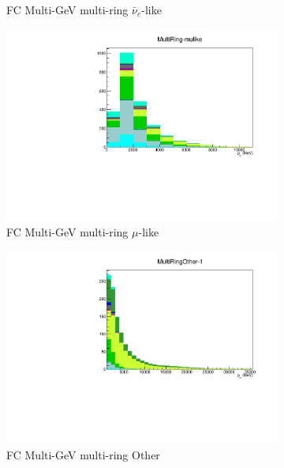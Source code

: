 \begin{figure}[ht]
\begin{subfigure}[t]{0.49\textwidth}
    \caption{FC Multi-GeV multi-ring $\bar{\nu}_e$-like}
    \end{subfigure}
    \begin{subfigure}[t]{0.49\textwidth}
    \includegraphics[width=\textwidth, trim= 0 0 0 30, clip]{Figures/Selections/AtmosphericByMode/MultiRing-mulike_LepMom.pdf}
    \caption{FC Multi-GeV multi-ring $\mu$-like}
    \end{subfigure}
    \begin{subfigure}[t]{0.49\textwidth}
    \includegraphics[width=\textwidth, trim= 0 0 0 30, clip]{Figures/Selections/AtmosphericByMode/MultiRingOther-1_LepMom.pdf}
    \caption{FC Multi-GeV multi-ring Other}
    \end{subfigure}
    \begin{subfigure}[t]{0.49\textwidth}

\end{subfigure}
\end{figure}
